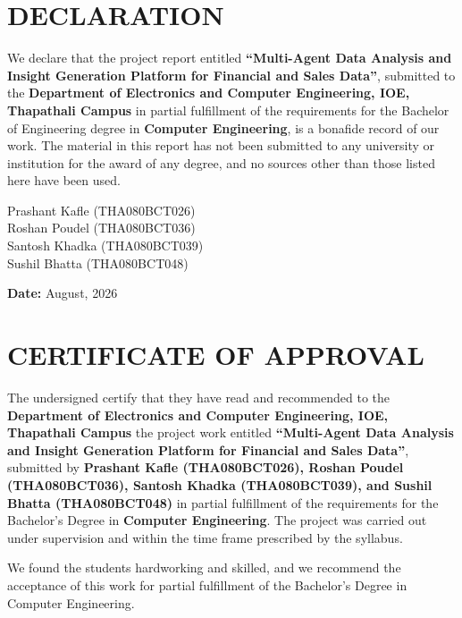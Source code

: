 \documentclass[12pt,a4paper,openany]{report}
\begin{document}
\chapter*{DECLARATION}

We declare that the project report entitled \textbf{``Multi-Agent Data Analysis and Insight Generation Platform for Financial and Sales Data''}, submitted to the \textbf{Department of Electronics and Computer Engineering, IOE, Thapathali Campus} in partial fulfillment of the requirements for the Bachelor of Engineering degree in \textbf{Computer Engineering}, is a bonafide record of our work. The material in this report has not been submitted to any university or institution for the award of any degree, and no sources other than those listed here have been used.

\vspace{2em}
\noindent Prashant Kafle (THA080BCT026)\\
Roshan Poudel (THA080BCT036)\\
Santosh Khadka (THA080BCT039)\\
Sushil Bhatta (THA080BCT048)

\vspace{1em}
\noindent \textbf{Date:} August, 2026

\clearpage

\chapter*{CERTIFICATE OF APPROVAL}

The undersigned certify that they have read and recommended to the \textbf{Department of Electronics and Computer Engineering, IOE, Thapathali Campus} the project work entitled \textbf{``Multi-Agent Data Analysis and Insight Generation Platform for Financial and Sales Data''}, submitted by \textbf{Prashant Kafle (THA080BCT026), Roshan Poudel (THA080BCT036), Santosh Khadka (THA080BCT039), and Sushil Bhatta (THA080BCT048)} in partial fulfillment of the requirements for the Bachelor's Degree in \textbf{Computer Engineering}. The project was carried out under supervision and within the time frame prescribed by the syllabus.

We found the students hardworking and skilled, and we recommend the acceptance of this work for partial fulfillment of the Bachelor's Degree in Computer Engineering.
\end{document}
